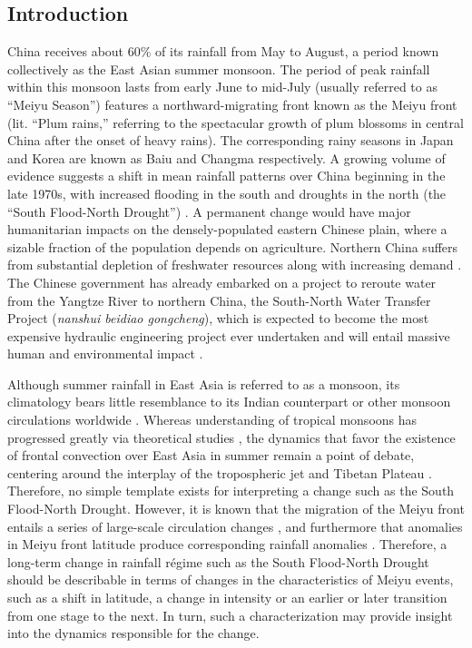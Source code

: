 \documentclass[draft,grl]{AGUTeX}
\begin{document}
\begin{article}

\section{Introduction}
 
 	China receives about 60\% of its rainfall from May to August, a period known collectively as the East Asian summer monsoon. The period of peak rainfall within this monsoon lasts from early June to mid-July (usually referred to as ``Meiyu Season'') features a northward-migrating front known as the Meiyu front (lit. ``Plum rains,'' referring to the spectacular growth of plum blossoms in central China after the onset of heavy rains). The corresponding rainy seasons in Japan and Korea are known as Baiu and Changma respectively. A growing volume of evidence suggests a shift in mean rainfall patterns over China beginning in the late 1970s, with increased flooding in the south and droughts in the north (the ``South Flood-North Drought'') \citep{Hu1997,Gong2002,Nigam2013}. A permanent change would have major humanitarian impacts on the densely-populated eastern Chinese plain, where a sizable fraction of the population depends on agriculture. Northern China suffers from substantial depletion of freshwater resources along with increasing demand \citep{Currell2012,Gleeson2012}. The Chinese government has already embarked on a project to reroute water from the Yangtze River to northern China, the South-North Water Transfer Project (\textit{nanshui beidiao gongcheng}), which is expected to become the most expensive hydraulic engineering project ever undertaken and will entail massive human and environmental impact \citep{Magee2011}.
 
	Although summer rainfall in East Asia is referred to as a monsoon, its climatology bears little resemblance to its Indian counterpart or other monsoon circulations worldwide \citep{Ding2005}. Whereas understanding of tropical monsoons has progressed greatly via theoretical studies \citep{Plumb1992,Prive2007,Bordoni2008}, the dynamics that favor the existence of frontal convection over East Asia in summer remain a point of debate, centering around the interplay of the tropospheric jet and Tibetan Plateau \citep{Molnar2010,Sampe2010,Chen2014}. Therefore, no simple template exists for interpreting a change such as the South Flood-North Drought. However, it is known that the migration of the Meiyu front entails a series of large-scale circulation changes \citep{Chen2004}, and furthermore that anomalies in Meiyu front latitude produce corresponding rainfall anomalies \citep{Kosaka2011}. Therefore, a long-term change in rainfall r\'egime such as the South Flood-North Drought should be describable in terms of changes in the characteristics of Meiyu events, such as a shift in latitude, a change in intensity or an earlier or later transition from one stage to the next. In turn, such a characterization may provide insight into the dynamics responsible for the change.
	

\end{article}
\end{document}
